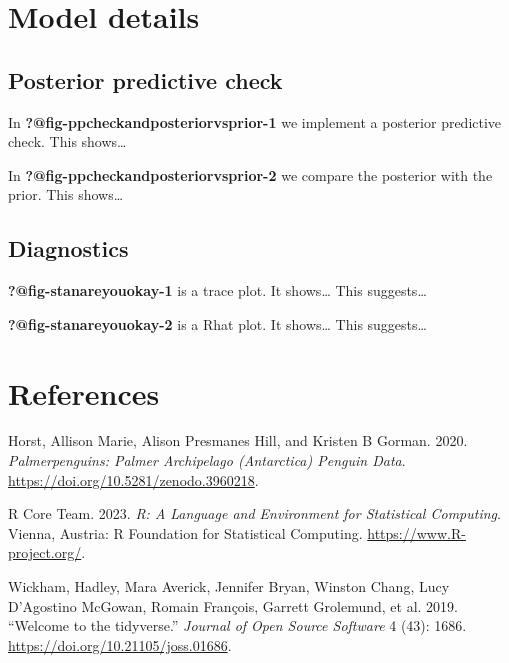 \documentclass[
]{article}
\newlength{\cslhangindent}
\newlength{\cslentryspacingunit} %
\newenvironment{CSLReferences}[2] %
 {%
  \setlength{\parindent}{0pt}
  \ifodd #1
  \let\oldpar\par
  \def\par{\hangindent=\cslhangindent\oldpar}
  \fi
  \setlength{\parskip}{#2\cslentryspacingunit}
 }%
 {}
\begin{document}
\hypertarget{sec-model-details}{%
\section{Model details}\label{sec-model-details}}

\hypertarget{posterior-predictive-check}{%
\subsection{Posterior predictive
check}\label{posterior-predictive-check}}

In \textbf{?@fig-ppcheckandposteriorvsprior-1} we implement a posterior
predictive check. This shows\ldots{}

In \textbf{?@fig-ppcheckandposteriorvsprior-2} we compare the posterior
with the prior. This shows\ldots{}

\hypertarget{diagnostics}{%
\subsection{Diagnostics}\label{diagnostics}}

\textbf{?@fig-stanareyouokay-1} is a trace plot. It shows\ldots{} This
suggests\ldots{}

\textbf{?@fig-stanareyouokay-2} is a Rhat plot. It shows\ldots{} This
suggests\ldots{}

\newpage

\hypertarget{references}{%
\section*{References}\label{references}}

\hypertarget{refs}{}
\begin{CSLReferences}{1}{0}
\leavevmode{}%
Horst, Allison Marie, Alison Presmanes Hill, and Kristen B Gorman. 2020.
\emph{Palmerpenguins: Palmer Archipelago (Antarctica) Penguin Data}.
\url{https://doi.org/10.5281/zenodo.3960218}.

\leavevmode{}%
R Core Team. 2023. \emph{R: A Language and Environment for Statistical
Computing}. Vienna, Austria: R Foundation for Statistical Computing.
\url{https://www.R-project.org/}.

\leavevmode{}%
Wickham, Hadley, Mara Averick, Jennifer Bryan, Winston Chang, Lucy
D'Agostino McGowan, Romain François, Garrett Grolemund, et al. 2019.
{``Welcome to the {tidyverse}.''} \emph{Journal of Open Source Software}
4 (43): 1686. \url{https://doi.org/10.21105/joss.01686}.

\end{CSLReferences}
\end{document}
